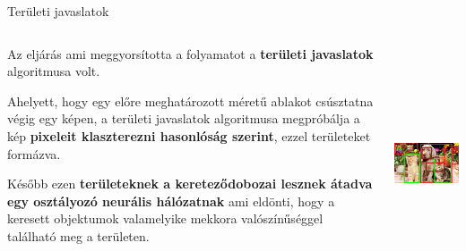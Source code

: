 \documentclass[english, aspectratio=169]{beamer}
\begin{document}
\begin{frame}{Területi javaslatok}
\begin{columns}
\begin{column}{.6\textwidth}
Az eljárás ami meggyorsította a folyamatot a \textbf{területi javaslatok} algoritmusa volt.\par\smallskip
Ahelyett, hogy egy előre meghatározott méretű ablakot csúsztatna végig egy képen, a területi javaslatok algoritmusa megpróbálja a kép \textbf{pixeleit klaszterezni hasonlóság szerint}, ezzel területeket formázva.\par\smallskip
Később ezen \textbf{területeknek a kereteződobozai lesznek átadva egy osztályozó neurális hálózatnak} ami eldönti, hogy a keresett objektumok valamelyike mekkora valószínűséggel található meg a területen.
\end{column}
\begin{column}{.4\textwidth}
\begin{center}
\includegraphics[height=7cm, width=6cm, keepaspectratio]{images/od_8.png}
\end{center}
\end{column}
\end{columns}
\end{frame}
\end{document}
